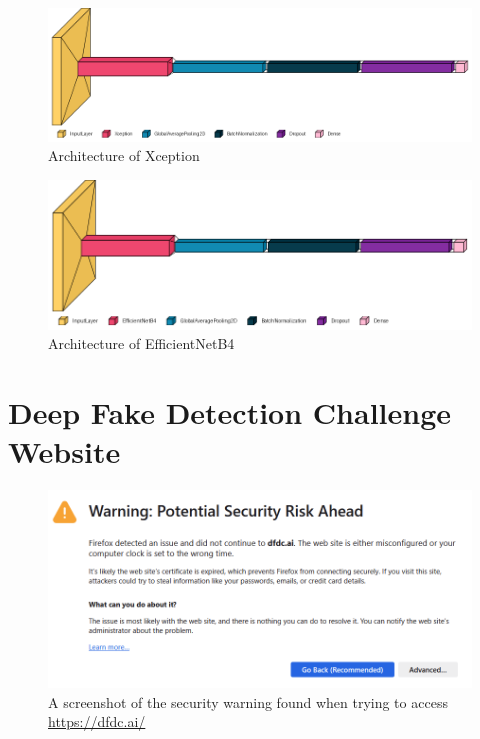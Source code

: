 \begin{figure}[H]
    \centering
    \includegraphics[width=1\linewidth]{dissertation//figures/xception.png}
    \caption{Architecture of Xception}
\end{figure}

\begin{figure}[H]
    \centering
    \includegraphics[width=1\linewidth]{dissertation//figures/efficientnet.png}
    \caption{Architecture of EfficientNetB4}
\end{figure}

\chapter{Deep Fake Detection Challenge Website}
\label{ch:dfdcai}

\begin{figure}[h]
    \centering
    \includegraphics[width=1\linewidth]{dissertation//figures/dfdc.png}
    \caption{A screenshot of the security warning found when trying to access \url{https://dfdc.ai/}}
    \label{fig:dfdcai}
\end{figure}

